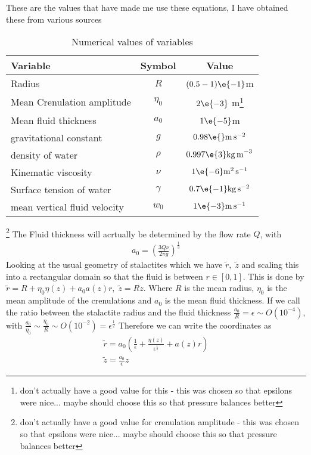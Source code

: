 \documentclass[12pt]{article}
\newcommand{\rt}{^{\frac{1}{2}}}
\begin{document}
	These are the values that have made me use these equations, I have obtained these from various sources \cite{short}
	\begin{table}[H]
		\centering
		\caption{Numerical values of variables}
		\begin{tabular}{|l|c|c|}
			\hline
			Variable&Symbol & Value\\
			\hline
			Radius& $R$ & $(0.5 - 1)\e{-1}$m\\
			Mean Crenulation amplitude& $\eta_0$&$2\e{-3}$ m\footnote{don't actually have a good value for this - this was chosen so that epsilons were nice... maybe should choose this so that pressure balances better}\\
			Mean fluid thickness & $a_0$ & $1\e{-5}$m\\ 
			gravitational constant & $g$&$ 0.98\e{}\mathrm{m}\,\mathrm{s}^{-2}$\\
			density of water & $\rho$&$0.997\e{3}\mathrm{kg\,m}^{-3}$\\
			Kinematic viscosity& $\nu$&$1\e{-6}\mathrm{m^2\,s^{-1}}$\\
			Surface tension of water& $\gamma$& $0.7\e{-1}\mathrm{kg\,s^{-2}}$\\
			mean vertical fluid velocity& $w_0$ & $1\e{-3}\mathrm{m\,s^{-1}}$
			\\ \hline
		\end{tabular}
	\end{table}\footnote{don't actually have a good value for crenulation amplitude - this was chosen so that epsilons were nice... maybe should choose this so that pressure balances better}
The Fluid thickness will acrtually be determined by the flow rate $Q$, with \begin{align}
a_0 = \left(\frac{3 Q\nu}{2\pi g}\right)^{\frac{1}{3}}
\end{align}
Looking at the usual geometry of stalactites which we have $\tilde r,\;\tilde z$ and scaling this into a rectangular domain so that the fluid is between $r\in[0,1]$. This is done by $\tilde{r} = R + \eta_0\eta(z) +a_0a(z) r,\; \tilde{z} = Rz$. Where $R$ is the mean radius, $\eta_0$ is the mean amplitude of the crenulations and $a_0$ is the mean fluid thickness. If we call the ratio between 
the stalactite radius and the fluid thickness $\frac{a_0}{R} = \epsilon \sim O(10^{-4})$, with $\frac{a_0}{\eta_0}\sim\frac{\eta_0}{R}\sim O(10^{-2}) = \epsilon\rt$ 
Therefore we can write the coordinates as
\begin{align}
\tilde{r} = a_0\left(\frac{1}{\epsilon}+\frac{\eta(z)}{\epsilon\rt}+a(z) r\right)\\
\tilde{z} = \frac{a_0}{\epsilon}z
\end{align}
\end{document}
